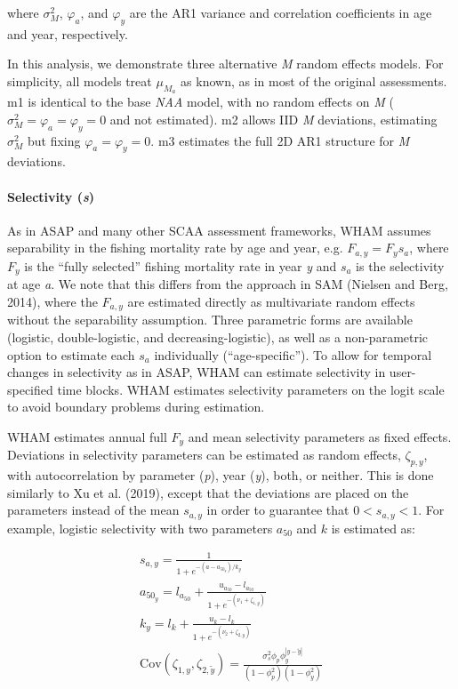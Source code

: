 \documentclass[]{article}
\let\oldparagraph\paragraph
\renewcommand{\paragraph}[1]{\oldparagraph{#1}\mbox{}}
\begin{document}
where \(\sigma^2_M\), \(\varphi_a\), and \(\varphi_y\) are the AR1
variance and correlation coefficients in age and year, respectively.

In this analysis, we demonstrate three alternative \emph{M} random
effects models. For simplicity, all models treat \(\mu_{M_a}\) as known,
as in most of the original assessments. m1 is identical to the base
\emph{NAA} model, with no random effects on \emph{M}
(\(\sigma^2_M = \varphi_a = \varphi_y = 0\) and not estimated). m2
allows IID \emph{M} deviations, estimating \(\sigma^2_M\) but fixing
\(\varphi_a = \varphi_y = 0\). m3 estimates the full 2D AR1 structure
for \emph{M} deviations.

\hypertarget{selectivity-s}{%
\paragraph{\texorpdfstring{Selectivity
(\emph{s})}{Selectivity (s)}}\label{selectivity-s}}

As in ASAP and many other SCAA assessment frameworks, WHAM assumes
separability in the fishing mortality rate by age and year, e.g.
\(F_{a,y} = F_y s_a\), where \(F_y\) is the ``fully selected'' fishing
mortality rate in year \emph{y} and \(s_a\) is the selectivity at age
\emph{a}. We note that this differs from the approach in SAM (Nielsen
and Berg, 2014), where the \(F_{a,y}\) are estimated directly as
multivariate random effects without the separability assumption. Three
parametric forms are available (logistic, double-logistic, and
decreasing-logistic), as well as a non-parametric option to estimate
each \(s_a\) individually (``age-specific''). To allow for temporal
changes in selectivity as in ASAP, WHAM can estimate selectivity in
user-specified time blocks. WHAM estimates selectivity parameters on the
logit scale to avoid boundary problems during estimation.

WHAM estimates annual full \(F_y\) and mean selectivity parameters as
fixed effects. Deviations in selectivity parameters can be estimated as
random effects, \(\zeta_{p,y}\), with autocorrelation by parameter
(\emph{p}), year (\emph{y}), both, or neither. This is done similarly to
Xu et al. (2019), except that the deviations are placed on the
parameters instead of the mean \(s_{a,y}\) in order to guarantee that
\(0 < s_{a,y} < 1\). For example, logistic selectivity with two
parameters \(a_{50}\) and \(k\) is estimated as:

\begin{equation}
  \begin{array}{cccc}
    s_{a,y} = \frac{1}{1 + e^{-(a - a_{{50}_y}) / k_y}} \\
    a_{{50}_y} = l_{a_{50}} + \frac{u_{a_{50}} - l_{a_{50}}}{1 + e^{-(\nu_1 + \zeta_{1,y})}} \\
    k_y = l_k + \frac{u_k - l_k}{1 + e^{-(\nu_2 + \zeta_{2,y})}} \\
    \text{Cov} \left( \zeta_{1,y}, \zeta_{2,\tilde{y}} \right) = \frac{\sigma^2_s \phi_p \phi^{|y-\tilde{y}|}_{y}}{\left(1-\phi^2_{p}\right) \left(1-\phi^2_{y}\right)}
  \end{array}
\end{equation}
\end{document}
